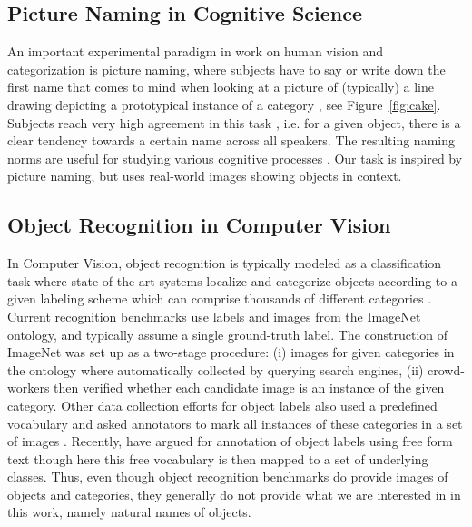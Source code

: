 \subsection{Picture Naming in Cognitive Science}

An important experimental paradigm in work on human vision and categorization is picture naming, where subjects have to say or write down the first name that comes to mind when looking at a picture of (typically) a line drawing depicting a prototypical instance of a category \cite{snodgrass,rossion2004revisiting}, see Figure\ \ref{fig:cake}.
Subjects reach very high agreement in this task \cite{rossion2004revisiting}, i.e. for a given object, there is a clear tendency towards a certain name across all speakers.
The resulting naming norms are useful for studying various cognitive processes \cite{humphreys1988cascade}.
Our task is inspired by picture naming, but uses real-world images showing objects in context.

\subsection{Object Recognition in Computer Vision}

In Computer Vision, object recognition is typically modeled as a classification task where state-of-the-art systems localize and categorize objects according to a given labeling scheme which can comprise thousands of different categories  \cite{googlenet,ILSVRC15}. 
Current recognition benchmarks use labels and images from the ImageNet \cite{imagenet_cvpr09} ontology, and typically assume a single ground-truth label. 
The construction of ImageNet was set up as a two-stage procedure: (i) images for given categories in the ontology where automatically collected by querying search engines, (ii) crowd-workers then verified whether each candidate image is an instance of the given category.
Other data collection efforts for object labels also used a predefined vocabulary and asked annotators to mark all instances of these categories in a set of images \cite{mscoco,OpenImages}. 
Recently,  have argued for annotation of object labels using free form text though here this free vocabulary is then mapped to a set of underlying classes.
Thus, even though object recognition benchmarks do provide images of objects and categories, they generally do not provide what we are interested in in this work, namely natural names of objects.



